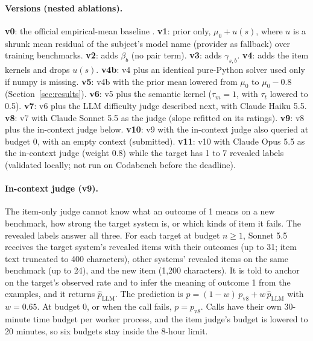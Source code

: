 \documentclass{article}
\begin{document}
\paragraph{Versions (nested ablations).}
\textbf{v0}: the official empirical-mean baseline \citep{paiec_baselines}.
\textbf{v1}: prior only, $\mu_0 + u(s)$, where $u$ is a shrunk mean residual of the subject's model name
(provider as fallback) over training benchmarks.
\textbf{v2}: adds $\beta_b$ (no pair term).
\textbf{v3}: adds $\gamma_{s,b}$.
\textbf{v4}: adds the item kernels and drops $u(s)$.
\textbf{v4b}: v4 plus an identical pure-Python solver used only if numpy is missing.
\textbf{v5}: v4b with the prior mean lowered from $\mu_0$ to $\mu_0-0.8$ (Section~\ref{sec:results}).
\textbf{v6}: v5 plus the semantic kernel ($\tau_m=1$, with $\tau_t$ lowered to 0.5).
\textbf{v7}: v6 plus the LLM difficulty judge described next, with Claude Haiku 5.5.
\textbf{v8}: v7 with Claude Sonnet 5.5 as the judge (slope refitted on its ratings).
\textbf{v9}: v8 plus the in-context judge below.
\textbf{v10}: v9 with the in-context judge also queried at budget 0, with an empty context (submitted).
\textbf{v11}: v10 with Claude Opus 5.5 as the in-context judge (weight 0.8) while the target has 1
to 7 revealed labels (validated locally; not run on Codabench before the deadline).

\paragraph{In-context judge (v9).} The item-only judge cannot know what an outcome of 1 means on a
new benchmark, how strong the target system is, or which kinds of item it fails. The revealed labels
answer all three. For each target at budget $n\ge1$, Sonnet 5.5 receives the target system's revealed
items with their outcomes (up to 31; item text truncated to 400 characters), other systems' revealed
items on the same benchmark (up to 24), and the new item (1,200 characters). It is told to anchor on
the target's observed rate and to infer the meaning of outcome 1 from the examples, and it returns
$\hat p_{\mathrm{LLM}}$. The prediction is $p=(1-w)\,p_{\mathrm{v8}}+w\,\hat p_{\mathrm{LLM}}$ with
$w=0.65$. At budget 0, or when the call fails, $p=p_{\mathrm{v8}}$. Calls have their own 30-minute
time budget per worker process, and the item judge's budget is lowered to 20 minutes, so six
budgets stay inside the 8-hour limit.
\end{document}
